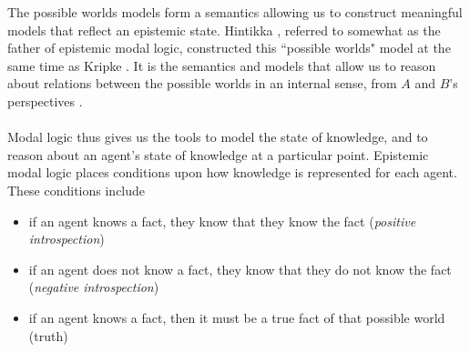The possible worlds models form a semantics allowing us to construct meaningful
models that reflect an epistemic state.
Hintikka \cite{hintikka1962knowledge}, referred to somewhat as the father of epistemic modal logic,
constructed this ``possible worlds" model at the same time as Kripke \cite{MALQ:MALQ19630090502}.
It is the semantics and models that allow us to reason about relations between the possible worlds in
an internal sense, from $A$ and $B$'s perspectives \cite{blackburn2002modal}.\\
\\
Modal logic thus gives us the tools to model the state of knowledge, and to reason about an agent's
state of knowledge at a particular point.
Epistemic modal logic places conditions upon how knowledge is represented for each agent.
These conditions include
\begin{itemize}
	\item if an agent knows a fact, they know that they know the fact ({\em positive introspection})
	\item if an agent does not know a fact, they know that they do not know the fact ({\em negative
		introspection})
	\item if an agent knows a fact, then it must be a true fact of that possible world (truth)
\end{itemize}

